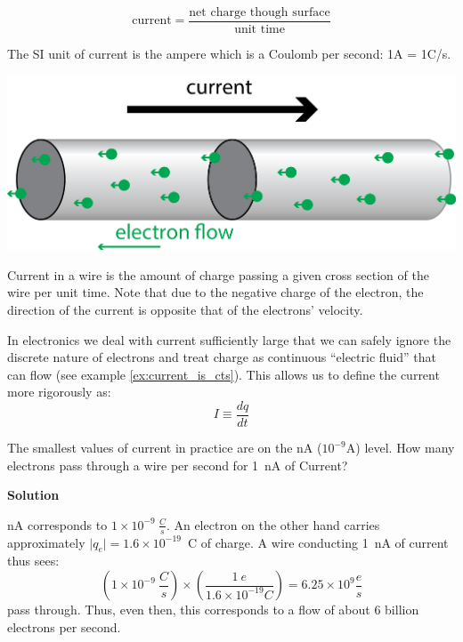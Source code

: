 \documentclass{tufte-book}
\newcommand\Solution{\par\textbf{\textsf{Solution}}\par\medskip}
\begin{document}
\begin{equation}\label{eq:defn_current_words}
\text{current} = \frac{\text{net charge though surface}}{\text{unit time}}
\end{equation}

\noindent The SI unit of current is the ampere which is a Coulomb per second: 1A = 1C/s.

\begin{marginfigure}%
  \includegraphics[width=\linewidth]{currentflow}
  \caption{Current in a wire is the amount of charge passing a given cross section of the wire per unit time. Note that due to the negative charge of the electron, the direction of the current is opposite that of the electrons' velocity.}
  \label{fig:curr}
\end{marginfigure}

In electronics we deal with current sufficiently large that we can safely ignore the discrete nature of electrons and treat charge as continuous ``electric fluid'' that can flow (see example \ref{ex:current_is_cts}). This allows us to define the current more rigorously as:
\begin{equation}\label{eq:defn_current}
I \equiv \frac{dq}{dt}
\end{equation}


\begin{myexample}[label = ex:current_is_cts]{The smallest values of current in practice are on the nA ($10^{-9}$A) level. How many electrons pass through a wire per second for 1~nA of Current?}
\Solution
1 nA corresponds to $1\times10^{-9}~\frac{C}{s}$. An electron on the other hand carries approximately $\vert q_e\vert = 1.6\times10^{-19}$~C of charge. A wire conducting 1~nA of current thus sees:
$$
\left(1\times10^{-9}~\frac{C}{s}\right)\times\left(\frac{1~e}{1.6\times10^{-19}C}\right) = 6.25\times10^9\frac{e}{s} 
$$
pass through. Thus, even then, this corresponds to a flow of about 6 billion electrons per second.
\end{myexample}
\end{document}

